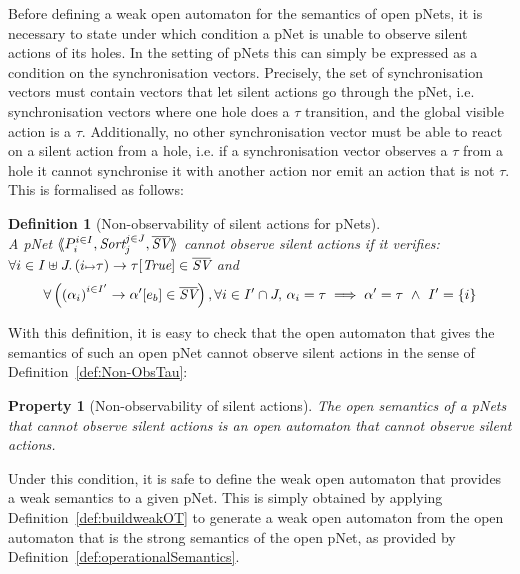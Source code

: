 \documentclass{lmcs}
\newcommand{\TODO}[1]{\textcolor{red}{\textbf{[TODO:#1]}}}
\newtheorem{definition}{Definition}
\newtheorem{property}{Property}
\begin{document}
Before defining a weak open automaton for the semantics of open pNets,
it is necessary to state under which condition a pNet is unable to
observe silent actions of its holes. In the setting of pNets this can
simply be expressed as a condition on the synchronisation
vectors. Precisely, the set of synchronisation vectors must contain
vectors that let silent actions go through the pNet,
i.e. synchronisation vectors where one hole does a $\tau$ transition,
and the global visible action is a $\tau$. Additionally, no other
synchronisation vector must be able to react on a silent action from a
hole, i.e. if a synchronisation vector observes a $\tau$ from a hole
it cannot synchronise it with another action nor emit an action that
is not $\tau$. This is formalised as follows:



\begin{definition}[Non-observability of silent actions for pNets]\label{def:non-obspNet}~\\
A pNet $\mylangle \pNet_i^{i\in I} , \Sort_j^{j\in J}, \set{\symb{SV}}\myrangle$
 \emph{cannot observe silent actions} if it verifies:\\ $\forall i\in I\uplus J.\, \SV{(i\mapsto \tau)}{\tau}{\True}\in \set{\symb{SV}}$ and 
\begin{equation*}
\forall \left(\SV{{(\alpha_i)}^{i\in I'}} 
{\alpha'} 
{e_b}\in \set{\symb{SV}}\right), %
\forall i\in I'\cap J,\, \alpha_i=\tau \implies %
\alpha'=\tau ~\land~ %
I'=\{i\}
\end{equation*}
\end{definition}

With this definition, it is easy to check that the open automaton that gives the semantics of such an open pNet cannot observe silent actions in the sense of Definition~\ref{def:Non-ObsTau}:

\begin{property}[Non-observability of silent actions]
The open semantics of a pNets that cannot observe silent actions is an open automaton that  cannot observe silent actions.
\end{property}


Under this condition, it is safe to define the weak open automaton that provides a weak semantics to a given pNet. This is simply obtained by applying Definition~\ref{def:buildweakOT} to generate a weak open automaton from the open automaton that is the strong semantics of the open pNet, as provided by Definition~\ref{def:operationalSemantics}.
\end{document}
